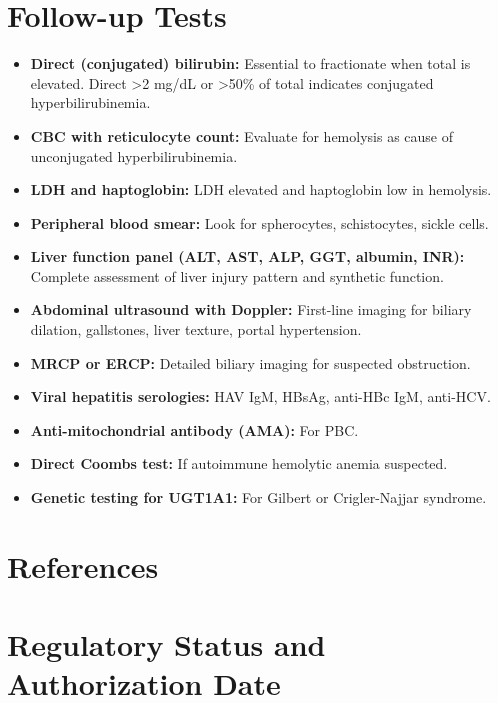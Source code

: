 \section*{Follow-up Tests}
\begin{itemize}
  \item \textbf{Direct (conjugated) bilirubin:} Essential to fractionate when total is elevated. Direct >2 mg/dL or >50\% of total indicates conjugated hyperbilirubinemia.
  \item \textbf{CBC with reticulocyte count:} Evaluate for hemolysis as cause of unconjugated hyperbilirubinemia.
  \item \textbf{LDH and haptoglobin:} LDH elevated and haptoglobin low in hemolysis.
  \item \textbf{Peripheral blood smear:} Look for spherocytes, schistocytes, sickle cells.
  \item \textbf{Liver function panel (ALT, AST, ALP, GGT, albumin, INR):} Complete assessment of liver injury pattern and synthetic function.
  \item \textbf{Abdominal ultrasound with Doppler:} First-line imaging for biliary dilation, gallstones, liver texture, portal hypertension.
  \item \textbf{MRCP or ERCP:} Detailed biliary imaging for suspected obstruction.
  \item \textbf{Viral hepatitis serologies:} HAV IgM, HBsAg, anti-HBc IgM, anti-HCV.
  \item \textbf{Anti-mitochondrial antibody (AMA):} For PBC.
  \item \textbf{Direct Coombs test:} If autoimmune hemolytic anemia suspected.
  \item \textbf{Genetic testing for UGT1A1:} For Gilbert or Crigler-Najjar syndrome.
\end{itemize}

\section*{References}



\clearpage
\section*{Regulatory Status and Authorization Date}

\clearpage
